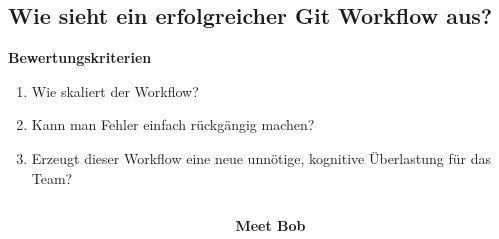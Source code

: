 \subsection{Wie sieht ein erfolgreicher Git Workflow aus?}\label{subsec:wie-sieht-ein-erfolgreicher-git-workflow-aus?}
\begin{frame}[c]
    \slidehead
    \large
    \textbf{Bewertungskriterien}
    \begin{enumerate}
        \item<2-> Wie skaliert der Workflow?
        \item<3-> Kann man Fehler einfach rückgängig machen?
        \item<4-> Erzeugt dieser Workflow eine neue unnötige, kognitive Überlastung für das Team?
    \end{enumerate}
\end{frame}

\begin{frame}[c]
    \begin{columns}[c]
        \begin{column}{.5\textwidth}
            \centering
            
        \end{column}
        \begin{column}{.5\textwidth}
            \Large
            \textbf{Meet Bob}
        \end{column}
    \end{columns}
\end{frame}

